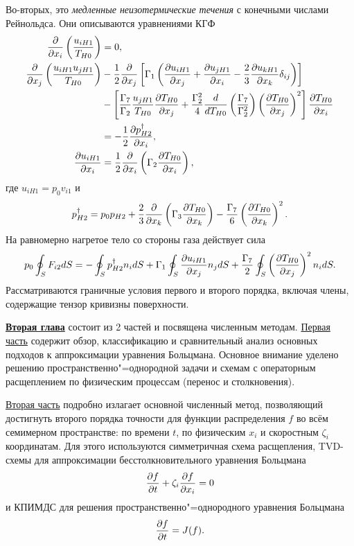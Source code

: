 Во-вторых, это \emph{медленные неизотермические течения} с конечными числами Рейнольдса.
Они описываются уравнениями КГФ
\begin{align*}
    \pder{x_i}\left(\frac{u_{iH1}}{T_{H0}}\right) &= 0, \\
    \pder{x_j}\left(\frac{u_{iH1}u_{jH1}}{T_{H0}}\right)
        &-\frac12\pder{x_j}\left[\Gamma_1\left(
            \pder[u_{iH1}]{x_j} + \pder[u_{jH1}]{x_i} - \frac23\pder[u_{kH1}]{x_k}\delta_{ij}
        \right)\right] \\
        &-\left[
            \frac{\Gamma_7}{\Gamma_2}\frac{u_{jH1}}{T_{H0}}\pder[T_{H0}]{x_j}
            + \frac{\Gamma_2^2}4 \der{T_{H0}}\left(\frac{\Gamma_7}{\Gamma_2^2}\right)
                \left(\pder[T_{H0}]{x_j}\right)^2
        \right]\pder[T_{H0}]{x_i} \\
        &= -\frac12\pder[p_{H2}^\dag]{x_i}, \\
    \pder[u_{iH1}]{x_i} &= \frac12\pder{x_i}\left(\Gamma_2\pder[T_{H0}]{x_i}\right),
\end{align*}
где \(u_{iH1} = p_0v_{i1}\) и
\begin{equation*}
    p_{H2}^\dag = p_0 p_{H2}
        + \frac23\pder{x_k}\left(\Gamma_3\pder[T_{H0}]{x_k}\right)
        - \frac{\Gamma_7}{6}\left(\pder[T_{H0}]{x_k}\right)^2.
\end{equation*}
На равномерно нагретое тело со стороны газа действует сила
\begin{equation*}
    p_0 \oint_S F_{i2} \dd{S} =
        - \oint_S p_{H2}^\dag n_i \dd{S} \\
        + \Gamma_1 \oint_S \pder[u_{iH1}]{x_j} n_j \dd{S}
        + \frac{\Gamma_7}{2} \oint_S \left(\pder[T_{H0}]{x_j}\right)^2 n_i \dd{S}.
\end{equation*}
Рассматриваются граничные условия первого и второго порядка, включая члены, содержащие тензор кривизны поверхности.


\underline{\textbf{Вторая глава}} состоит из 2 частей и посвящена численным методам.
\underline{Первая часть} содержит обзор, классификацию и сравнительный анализ основных подходов к аппроксимации уравнения Больцмана.
Основное внимание уделено решению пространственно"=однородной задачи и схемам с операторным расщеплением
по физическим процессам (перенос и столкновения).

\underline{Вторая часть} подробно излагает основной численный метод,
позволяющий достигнуть второго порядка точности для функции распределения \(f\) во всём семимерном пространстве:
по времени \(t\), по физическим \(x_i\) и скоростным \(\zeta_i\) координатам.
Для этого используются симметричная схема расщепления, TVD-схемы для аппроксимации
бесстолкновительного уравнения Больцмана
\begin{equation*}
    \pder[f]{t} + \zeta_i\pder[f]{x_i} = 0
\end{equation*}
и КПИМДС для решения пространственно"=однородного уравнения Больцмана
\begin{equation*}
    \pder[f]{t} = J(f).
\end{equation*}

